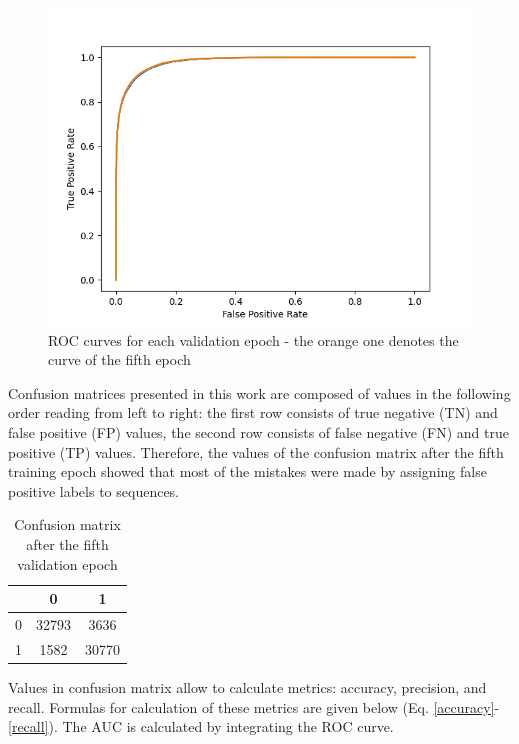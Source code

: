 \documentclass[12pt]{article}
\begin{document}
	\begin{figure}[h!]
		\centering
		\includegraphics[scale=0.7]{validation_4_2713.png}

		\caption{ ROC curves for each validation epoch - the orange 
		one denotes the curve of the fifth epoch}
		\label{figure:SLP003validation4}
	\end{figure}

	Confusion matrices presented in this work are composed of values in the
	following order reading from left to right: the first row consists of true 
	negative (TN) and false positive (FP) values, the second row consists of 
	false negative (FN) and true positive (TP) values.
	Therefore, the values of the confusion matrix after the fifth training epoch
	showed that most of the mistakes were made by assigning false positive 
	labels to sequences.

	\begin{table}[h!]
		\caption{Confusion matrix after the fifth validation epoch}
		\vspace{0.2cm}
		\centering
		\begin{tabular}{ | c | c c | }
			\hline 
			& 0 & 1 \\
			\hline  
			0 & 32793 & 3636 \\
			1 & 1582 & 30770 \\
			\hline    
		\end{tabular}
		\label{table:SLP003confusionMatrixValidation4}
	\end{table}

	Values in confusion matrix allow to calculate metrics: accuracy, precision,
	and recall. Formulas for calculation of these metrics are given below 
	(Eq. \ref{accuracy}-\ref{recall}).
	The AUC is calculated by integrating the ROC curve. 
\end{document}
